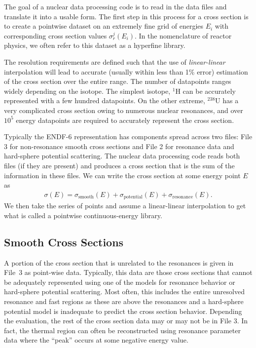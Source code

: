 The goal of a nuclear data processing code is to read in the data files and translate it into a usable form. The first step in this process for a cross section is to create a pointwise dataset on an extremely fine grid of energies $E_i$ with corresponding cross section values $\sigma_r^j(E_i)$. In the nomenclature of reactor physics, we often refer to this dataset as a hyperfine library. 

The resolution requirements are defined such that the use of \emph{linear-linear} interpolation will lead to accurate (usually within less than 1\% error) estimation of the cross section over the entire range. The number of datapoints ranges widely depending on the isotope. The simplest isotope, $^1$H can be accurately represented with a few hundred datapoints. On the other extreme, $^{238}$U has a very complicated cross section owing to numerous nuclear resonances, and over $10^5$ energy datapoints are required to accurately represent the cross section. 

Typically the ENDF-6 representation has components spread across two files: File 3 for non-resonance smooth cross sections and File 2 for resonance data and hard-sphere potential scattering. The nuclear data processing code reads both files (if they are present) and produces a cross section that is the sum of the information in these files. We can write the cross section at some energy point $E$ as
\begin{align}
  \sigma(E) = \sigma_\text{smooth}(E) + \sigma_\text{potential}(E) + \sigma_\text{resonance}(E) .
\end{align}
We then take the series of points and assume a linear-linear interpolation to get what is called a pointwise continuous-energy library.

\subsection{Smooth Cross Sections}

A portion of the cross section that is unrelated to the resonances is given in File~3 as point-wise data. Typically, this data are those cross sections that cannot be adequately represented using one of the models for resonance behavior or hard-sphere potential scattering. Most often, this includes the entire unresolved resonance and fast regions as these are above the resonances and a hard-sphere potential model is inadequate to predict the cross section behavior. Depending the evaluation, the rest of the cross section data may or may not be in File 3. In fact, the thermal region can often be reconstructed using resonance parameter data where the ``peak'' occurs at some negative energy value.

